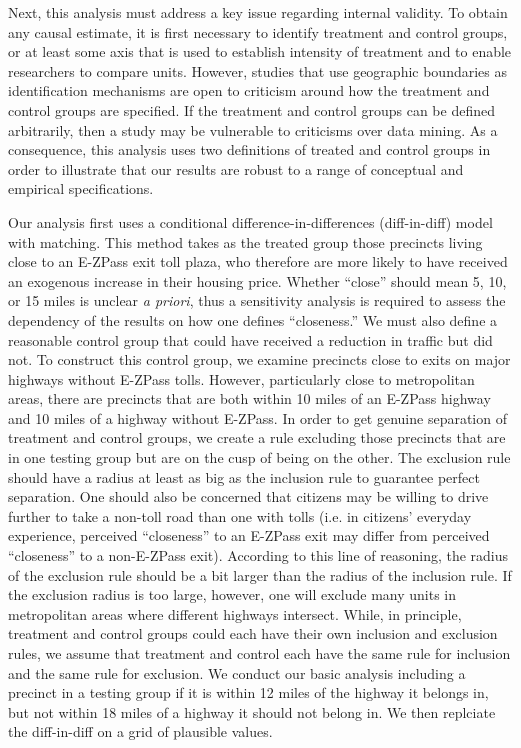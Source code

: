 
Next, this analysis must address a key issue regarding internal validity. To obtain any causal estimate, it is first necessary to identify treatment and control groups, or at least some axis that is used to establish intensity of treatment and to enable researchers to compare units. However, studies that use geographic boundaries as identification mechanisms are open to criticism around how the treatment and control groups are specified. If the treatment and control groups can be defined arbitrarily, then a study may be vulnerable to criticisms over data mining. As a consequence, this analysis uses two definitions of treated and control groups in order to illustrate that our results are robust to a range of conceptual and empirical specifications. 

Our analysis first uses a conditional difference-in-differences (diff-in-diff) model with matching. This method takes as the treated group those precincts living close to an E-ZPass exit toll plaza, who therefore are more likely to have received an exogenous increase in their housing price. Whether ``close'' should mean 5, 10, or 15 miles is unclear \emph{a priori}, thus a sensitivity analysis is required to assess the dependency of the results on how one defines ``closeness.'' We must also define a reasonable control group that could have received a reduction in traffic but did not. To construct this control group, we examine precincts close to exits on major highways without E-ZPass tolls. However, particularly close to metropolitan areas, there are precincts that are both within 10 miles of an E-ZPass highway and 10 miles of a highway without E-ZPass.  In order to get genuine separation of treatment and control groups, we create a rule excluding those precincts that are in one testing group but are on the cusp of being on the other. The exclusion rule should have a radius at least as big as the inclusion rule to guarantee perfect separation. One should also be concerned that citizens may be willing to drive further to take a non-toll road than one with tolls (i.e. in citizens' everyday experience, perceived ``closeness'' to an E-ZPass exit may differ from perceived ``closeness'' to a non-E-ZPass exit). According to this line of reasoning, the radius of the exclusion rule should be a bit larger than the radius of the inclusion rule. If the exclusion radius is too large, however, one will exclude many units in metropolitan areas where different highways intersect. While, in principle, treatment and control groups could each have their own inclusion and exclusion rules, we assume that treatment and control each have the same rule for inclusion and the same rule for exclusion.  We conduct our basic analysis including a precinct in a testing group if it is within 12 miles of the highway it belongs in, but not within 18 miles of a highway it should not belong in. We then replciate the diff-in-diff on a grid of plausible values.


